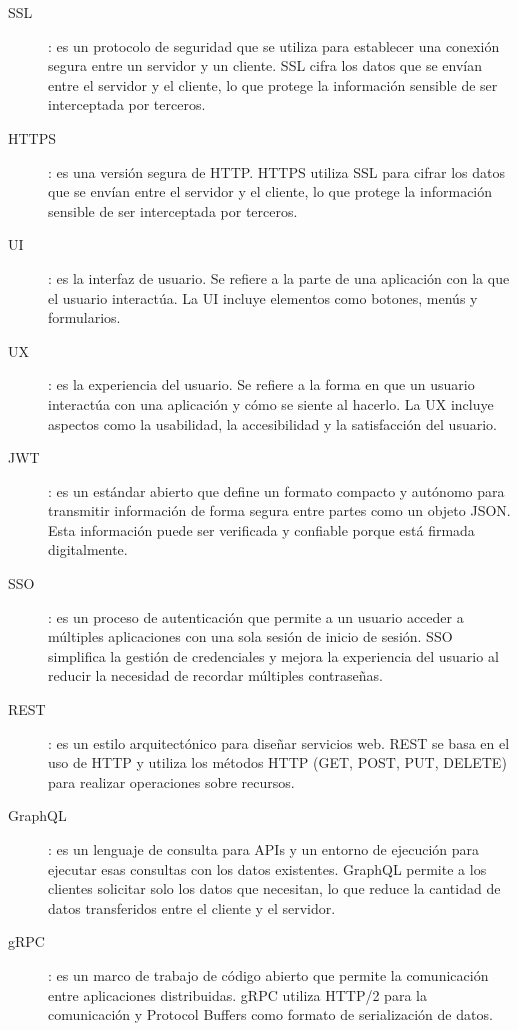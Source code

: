 \begin{description}
    \item [\hypertarget{ssl}{SSL}]: es un protocolo de seguridad que se utiliza para establecer una conexión segura entre un servidor y un cliente. SSL cifra los datos que se envían entre el servidor y el cliente, lo que protege la información sensible de ser interceptada por terceros.
    \item [\hypertarget{https}{HTTPS}]: es una versión segura de HTTP. HTTPS utiliza SSL para cifrar los datos que se envían entre el servidor y el cliente, lo que protege la información sensible de ser interceptada por terceros.
    \item [\hypertarget{ui}{UI}]: es la interfaz de usuario. Se refiere a la parte de una aplicación con la que el usuario interactúa. La UI incluye elementos como botones, menús y formularios.
    \item [\hypertarget{ux}{UX}]: es la experiencia del usuario. Se refiere a la forma en que un usuario interactúa con una aplicación y cómo se siente al hacerlo. La UX incluye aspectos como la usabilidad, la accesibilidad y la satisfacción del usuario.
    \item [\hypertarget{jwt}{JWT}]: es un estándar abierto que define un formato compacto y autónomo para transmitir información de forma segura entre partes como un objeto JSON. Esta información puede ser verificada y confiable porque está firmada digitalmente.
    \item [\hypertarget{sso}{SSO}]: es un proceso de autenticación que permite a un usuario acceder a múltiples aplicaciones con una sola sesión de inicio de sesión. SSO simplifica la gestión de credenciales y mejora la experiencia del usuario al reducir la necesidad de recordar múltiples contraseñas.
    \item [\hypertarget{rest}{REST}]: es un estilo arquitectónico para diseñar servicios web. REST se basa en el uso de HTTP y utiliza los métodos HTTP (GET, POST, PUT, DELETE) para realizar operaciones sobre recursos.
    \item [\hypertarget{graphql}{GraphQL}]: es un lenguaje de consulta para APIs y un entorno de ejecución para ejecutar esas consultas con los datos existentes. GraphQL permite a los clientes solicitar solo los datos que necesitan, lo que reduce la cantidad de datos transferidos entre el cliente y el servidor.
    \item [\hypertarget{grpc}{gRPC}]: es un marco de trabajo de código abierto que permite la comunicación entre aplicaciones distribuidas. gRPC utiliza HTTP/2 para la comunicación y Protocol Buffers como formato de serialización de datos.
\end{description}

\endinput